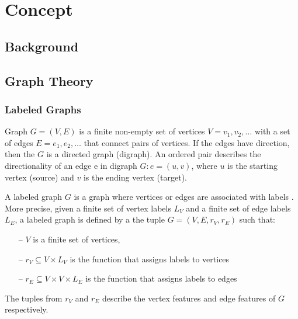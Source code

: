
\chapter{Concept} \label{chap:Concept}
\minitoc\vspace{1em}

\section{Background}

\section{Graph Theory}
\subsection{Labeled Graphs}
Graph $G = (V,E)$ is a finite non-empty set of vertices $V = {v_{1}, v_{2}, …}$ with a set of edges $E = {e_{1}, e_{2}, …}$ that connect pairs of vertices.
If the edges have direction, then the $G$ is a directed graph (digraph). 
An ordered pair describes the directionality of an edge e in digraph $G: e = (u,v)$,
where $u$ is the starting vertex (source) and $v$ is the ending vertex (target). 

A labeled graph $G$ is a graph where vertices or edges are associated with labels \cite{Champin2003}. 
More precise, given a finite set of vertex labels $L_{V}$ and a finite set of edge labels $L_{E}$, a labeled graph is defined by a the tuple $G = (V, E, r_{V} , r_{E})$ such that:

\begin{itemize}
	\item[--]  $V$ is a finite set of vertices,
	\item[--] $r_{V} \subseteq V \times L_{V}$ is the function that assigns labels to vertices
	\item[--]  $r_{E} \subseteq V \times V \times L_{E}$ is the function that assigns labels to edges
\end{itemize}

The tuples from $r_{V}$ and $ r_{E} $ describe the vertex features and edge features of $G$ respectively. 


